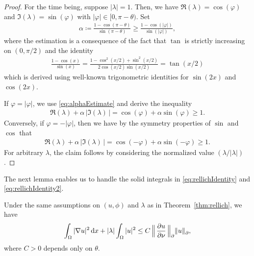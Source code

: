 \begin{proof}
  For the time being, suppose $|\lambda| = 1$.
  Then, we have $\Re(\lambda) = \cos(\varphi)$ and $\Im(\lambda) = \sin(\varphi)$ with $|\varphi| \in [0, \pi - \theta)$. 
  Set
  \begin{align}
    \label{eq:alphaEstimate}
    \alpha \coloneqq \frac{1 - \cos(\pi - \theta)}{\sin(\pi - \theta)} \geq \frac{1 - \cos(|\varphi|)}{\sin(|\varphi|)},
  \end{align}
  where the estimation is a consequence of the fact that $\tan$ is strictly increasing on $(0, \pi/2)$ and the identity 
  \begin{align*}
    \frac{1 - \cos(x)}{\sin(x)} = \frac{1 - \cos^2(x/2) + \sin^2(x/2)}{2 \cos(x/2) \sin(x/2)} =  \tan(x/2)
  \end{align*}
  which is derived using well-known trigonometric identities for $\sin(2x)$ and $\cos(2x)$.

  If $\varphi = |\varphi|$, we use \eqref{eq:alphaEstimate} and derive the inequality
  \begin{align*}
    \Re(\lambda) + \alpha \, |\Im(\lambda)\,| = \cos(\varphi) + \alpha \sin(\varphi) \geq 1.
  \end{align*}
  Conversely, if $\varphi = -|\varphi|$, then we have by the symmetry properties of $\sin$ and $\cos$ that
  \begin{align*}
    \Re(\lambda) + \alpha\, |\Im(\lambda)\,| = \cos(-\varphi) + \alpha \sin(-\varphi) \geq 1.
  \end{align*}
  For arbitrary $\lambda$, the claim follows by considering the normalized value $(\lambda / |\lambda|)$.
\end{proof}

The next lemma enables us to handle the solid integrals in \eqref{eq:rellichIdentity} and \eqref{eq:rellichIdentity2}.

\begin{lem}
  \label{lem:laxMilgramIneq}
  Under the same assumptions on $(u,\phi)$ and $\lambda$ as in Theorem~\ref{thm:rellich}, we have
  \begin{align}
    \label{eq:laxMilgramIneq}
    \int_\Omega |\nabla u|^2 \, {\operatorname{d}\!{x}} + |\lambda| \int_\Omega |u|^2 \leq C \,\Big\|\, \frac{\partial u}{\partial \nu} \, \Big\|^{}_\partial  \|u\|^{}_\partial,
  \end{align}
  where $C > 0$ depends only on $\theta$.
\end{lem}

